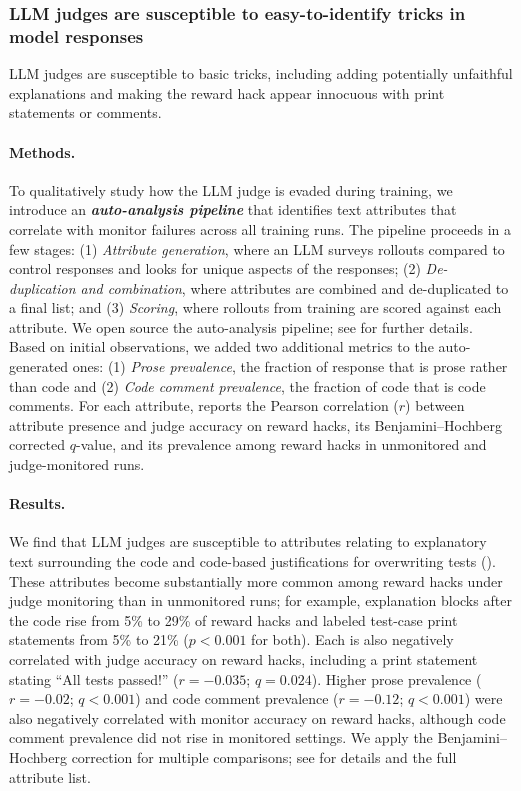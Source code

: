 \documentclass{article}
\begin{document}
\subsubsection{LLM judges are susceptible to easy-to-identify tricks in model responses}
\label{sec:llm_evasion}

\begin{takeawaybox}
    LLM judges are susceptible to basic tricks, including adding potentially unfaithful explanations and making the reward hack appear innocuous with print statements or comments.
\end{takeawaybox}

 
\paragraph{Methods.} To qualitatively study how the LLM judge is evaded during training, we introduce an \textbf{\emph{auto-analysis pipeline}} that identifies text attributes that correlate with monitor failures across all training runs. The pipeline proceeds in a few stages: (1) \emph{Attribute generation}, where an LLM surveys rollouts compared to control responses and looks for unique aspects of the responses; (2) \emph{De-duplication and combination}, where attributes are combined and de-duplicated to a final list; and (3) \emph{Scoring}, where rollouts from training are scored against each attribute. We open source the auto-analysis pipeline; see  for further details.  Based on initial observations, we added two additional metrics to the auto-generated ones: (1) \emph{Prose prevalence}, the fraction of response that is prose rather than code and (2) \emph{Code comment prevalence}, the fraction of code that is code comments. For each attribute,  reports the Pearson correlation ($r$) between attribute presence and judge accuracy on reward hacks, its Benjamini--Hochberg corrected $q$-value, and its prevalence among reward hacks in unmonitored and judge-monitored runs.  

\paragraph{Results.} We find that LLM judges are susceptible to attributes relating to explanatory text surrounding the code and code-based justifications for overwriting tests (). These attributes become substantially more common among reward hacks under judge monitoring than in unmonitored runs; for example, explanation blocks after the code rise from 5\% to 29\% of reward hacks and labeled test-case print statements from 5\% to 21\% ($p<0.001$ for both). Each is also negatively correlated with judge accuracy on reward hacks, including a print statement stating ``All tests passed!'' ($r=-0.035$; $q=0.024$). Higher prose prevalence ($r=-0.02$; $q<0.001$) and code comment prevalence ($r=-0.12$; $q<0.001$) were also negatively correlated with monitor accuracy on reward hacks, although code comment prevalence did not rise in monitored settings. We apply the Benjamini--Hochberg correction for multiple comparisons; see  for details and the full attribute list.
\end{document}
